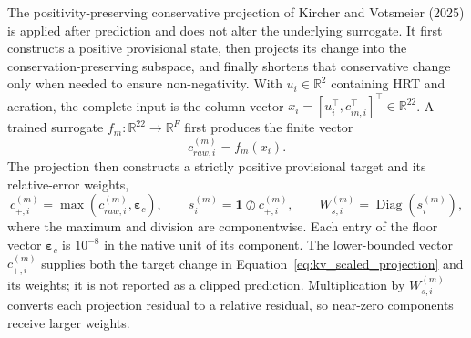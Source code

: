 \documentclass[a4paper,fleqn]{cas-sc}
\begin{document}
The positivity-preserving conservative projection of Kircher and Votsmeier (2025) is applied after prediction and does not alter the underlying surrogate. It first constructs a positive provisional state, then projects its change into the conservation-preserving subspace, and finally shortens that conservative change only when needed to ensure non-negativity. With $u_i\in\mathbb{R}^{2}$ containing HRT and aeration, the complete input is the column vector $x_i=[u_i^\top,c_{in,i}^\top]^\top\in\mathbb{R}^{22}$. A trained surrogate $f_m:\mathbb{R}^{22}\rightarrow\mathbb{R}^{F}$ first produces the finite vector
\begin{equation}
\label{eq:raw_component_prediction}
c_{raw,i}^{(m)}=f_m(x_i).
\end{equation}
The projection then constructs a strictly positive provisional target and its relative-error weights,
\begin{equation}
\label{eq:positive_scaling}
c_{+,i}^{(m)}=\max\!\left(c_{raw,i}^{(m)},\boldsymbol{\varepsilon}_c\right),\qquad
s_i^{(m)}=\mathbf{1}\oslash c_{+,i}^{(m)},\qquad
W_{s,i}^{(m)}=\operatorname{Diag}\!\left(s_i^{(m)}\right),
\end{equation}
where the maximum and division are componentwise. Each entry of the floor vector $\boldsymbol{\varepsilon}_c$ is $10^{-8}$ in the native unit of its component. The lower-bounded vector $c_{+,i}^{(m)}$ supplies both the target change in Equation~\eqref{eq:kv_scaled_projection} and its weights; it is not reported as a clipped prediction. Multiplication by $W_{s,i}^{(m)}$ converts each projection residual to a relative residual, so near-zero components receive larger weights.
\end{document}
